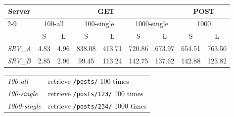 \begin{table*}
    \centering
    \begin{tabular}{l*{8}c}
        \toprule
        \multicolumn{1}{c}{\textbf{Server}} & \multicolumn{6}{c}{\textbf{GET}} & \multicolumn{2}{c}{\textbf{POST}} \\
        \cmidrule{2-9} %
        & \multicolumn{2}{c}{100-all} & \multicolumn{2}{c}{100-single} & \multicolumn{2}{c}{1000-single} & \multicolumn{2}{c}{1000} \\
        & S & L & S & L & S & L & S & L \\ 
        \midrule
        \emph{SRV\_A} & 4.83 & 4.96 & 838.08 & 413.71 & 720.86 & 673.97 & 654.51 & 763.50 \\
        \emph{SRV\_B} & 2.85 & 2.96 & 99.45 & 113.24 & 142.75 & 137.62 & 142.88 & 123.82 \\
        \bottomrule
    \end{tabular}
    \caption{A table (of requests/second)}
    \caption*{\textbf{GET} Legend}
        \begin{tabular}{*{2}l}
            \toprule
            \emph{100-all} & retrieve \texttt{/posts/} 100 times \\
            \emph{100-single} & retrieve \texttt{/posts/123/} 100 times \\
            \emph{1000-single} & retrieve \texttt{/posts/234/} 1000 times \\
            \bottomrule
        \end{tabular}
    \label{tab:eval}
\end{table*}
